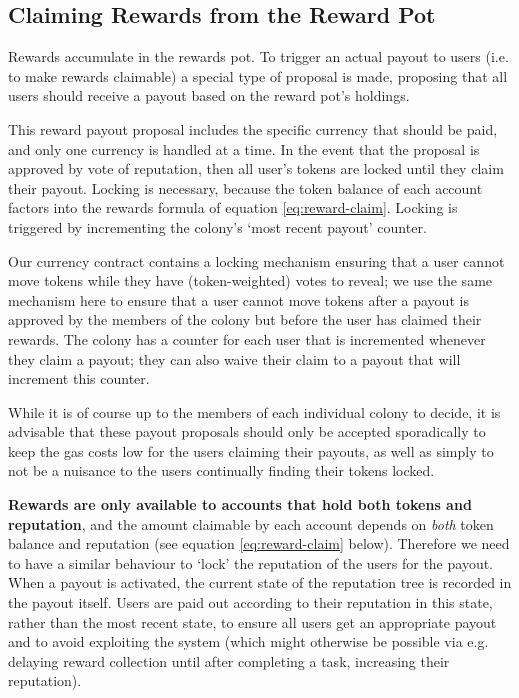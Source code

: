 \subsection{Claiming Rewards from the Reward Pot}\label{sec:claimrewards}
Rewards accumulate in the rewards pot. To trigger an actual payout to users (i.e. to make rewards claimable) a special type of proposal is made, proposing that all users should receive a payout based on the reward pot's holdings.

This reward payout proposal includes the specific currency that should be paid, and only one currency is handled at a time. In the event that the proposal is approved by vote of reputation, then all user's tokens are locked until they claim their payout. Locking is necessary, because the token balance of each account factors into the rewards formula of equation \eqref{eq:reward-claim}. Locking is triggered by incrementing the colony's `most recent payout' counter.

Our currency contract contains a locking mechanism ensuring that a user cannot move tokens while they have (token-weighted) votes to reveal; we use the same mechanism here to ensure that a user cannot move tokens after a payout is approved by the members of the colony but before the user has claimed their rewards. The colony has a counter for each user that is incremented whenever they claim a payout; they can also waive their claim to a payout that will increment this counter.

While it is of course up to the members of each individual colony to decide, it is advisable that these payout proposals should only be accepted sporadically to keep the gas costs low for the users claiming their payouts, as well as simply to not be a nuisance to the users continually finding their tokens locked.

\textbf{Rewards are only available to accounts that hold both tokens and reputation}, and the amount claimable by each account depends on \emph{both} token balance and reputation (see equation \eqref{eq:reward-claim} below). Therefore we need to have a similar behaviour to `lock' the reputation of the users for the payout. When a payout is activated, the current state of the reputation tree is recorded in the payout itself. Users are paid out according to their reputation in this state, rather than the most recent state, to ensure all users get an appropriate payout and to avoid exploiting the system (which might otherwise be possible via e.g. delaying reward collection until after completing a task, increasing their reputation).

